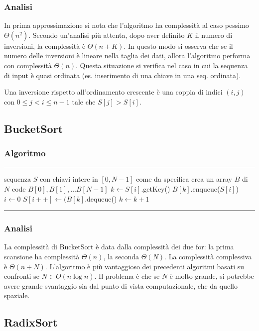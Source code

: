 \documentclass[a4paper]{article}
\makeatletter
\newenvironment{algo}[4]{
	\noindent\rule{\textwidth}{0.4pt}
	\begin{algorithmic}[1]
		\addtocounter{ALG@line}{-1}
		\Procedure{#1}{#2}
		\Require #3
		\Ensure #4
		\Statex }{
		\EndProcedure
	\end{algorithmic}
	\rule{\textwidth}{0.4pt}}
\makeatother
\begin{document}
\subsubsection*{Analisi}
In prima approssimazione si nota che l'algoritmo ha complessità al caso pessimo \(\Theta(n^2)\). Secondo un'analisi più attenta,
dopo aver definito \(K\) il numero di inversioni, la complessità è \(\Theta(n + K)\). In questo modo si osserva che se il numero
delle inversioni è lineare nella taglia dei dati, allora l'algoritmo performa con complessità \(\Theta(n)\). Questa situazione
si verifica nel caso in cui la sequenza di input è quasi ordinata (es. inserimento di una chiave in una seq. ordinata).

Una inversione rispetto all'ordinamento crescente è una coppia di indici \((i,j)\) con \(0 \leq j < i \leq n-1\) tale che \(S[j] > S[i]\).

\subsection{BucketSort}
\subsubsection*{Algoritmo}
\begin{algo}{BucketSort}{$S$}{sequenza $S$ con chiavi intere in \([0,N-1]\)}{come da specifica}
	\State crea un array \(B\) di \(N\) code \(B[0], B[1], \dots B[N-1]\)
		\State \(k \gets S[i]\).getKey()
		\State \(B[k]\).enqueue(\(S[i]\))
	\EndFor
	\State \(i \gets 0\)
			\State \(S[i++] \gets (B[k]\).dequeue()
		\EndWhile
		\State \(k \gets k+1\)
	\EndFor
\end{algo}

\subsubsection*{Analisi}
La complessità di BucketSort è data dalla complessità dei due for: la prima scansione ha complessità \(\Theta(n)\), la seconda
\(\Theta(N)\). La complessità complessiva è \(\Theta(n + N)\). L'algoritmo è più vantaggioso dei precedenti algoritmi basati 
su confronti se \(N \in O(n \log n)\). Il problema è che se \(N\) è molto grande, si potrebbe avere grande svantaggio sia dal
punto di vista computazionale, che da quello spaziale.

\subsection{RadixSort}
\end{document}
